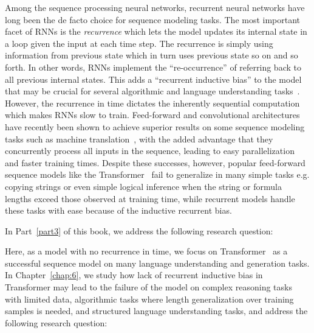 Among the sequence processing neural networks, recurrent neural networks have long been the de facto choice for sequence modeling tasks. The most important facet of RNNs is the \emph{recurrence} which lets the model updates its internal state in a loop given the input at each time step. The recurrence is simply using information from previous state which in turn uses previous state so on and so forth.  In other words, RNNs implement the ``re-occurrence'' of referring back to all previous internal states. This adds a ``recurrent inductive bias'' to the model that may be crucial for several algorithmic and language understanding tasks~\cite{tran2016recurrent,Dehghani:ICLR:2019}.
However, the recurrence in time dictates the inherently sequential computation which makes RNNs slow to train. Feed-forward and convolutional architectures have recently been shown to achieve superior results on some sequence modeling tasks such as machine translation~\citep{vaswani2017attention, NalBytenet2017}, with the added advantage that they concurrently process all inputs in the sequence, leading to easy parallelization and faster training times. Despite these successes, however, popular feed-forward sequence models like the Transformer~\citep{vaswani2017attention} fail to generalize in many simple tasks e.g. copying strings or even simple logical inference when the string or formula lengths exceed those observed at training time, while recurrent models handle these tasks with ease because of the inductive recurrent bias.

In Part~\ref{part3} of this book, we address the following research question:
\begin{resqbox}
\emph{}
\end{resqbox}

Here, as a model with no recurrence in time, we focus on Transformer~\citep{vaswani2017attention} as a successful sequence model on many language understanding and generation tasks. In Chapter~\ref{chap:6}, we study how lack of recurrent inductive bias in Transformer may lead to the failure of the model on complex reasoning tasks with limited data, algorithmic tasks where length generalization over training samples is needed, and structured language understanding tasks, and address the following research question:
\begin{resqbox}
\emph{}
\end{resqbox}

